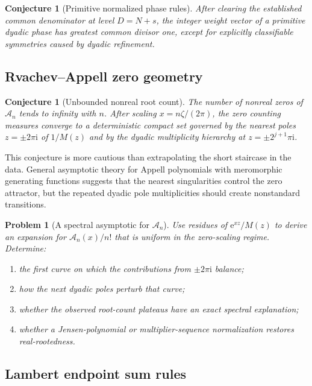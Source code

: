 \documentclass[11pt]{article}
\numberwithin{equation}{section}
\newtheorem{conjecture}[theorem]{Conjecture}
\newtheorem{problem}[theorem]{Problem}
\theoremstyle{definition}
\theoremstyle{remark}
\newcommand{\e}{\mathrm e}
\newcommand{\iu}{\mathrm i}
\newcommand{\Acal}{\mathscr A}
\begin{document}
\begin{conjecture}[Primitive normalized phase rules]
\label{conj:primitive-rules}
After clearing the established common denominator at level $D=N+s$, the integer weight vector of a primitive dyadic phase has greatest common divisor one, except for explicitly classifiable symmetries caused by dyadic refinement.
\end{conjecture}

\subsection{Rvachev--Appell zero geometry}

\begin{conjecture}[Unbounded nonreal root count]
\label{conj:Appell-root-staircase}
The number of nonreal zeros of $\Acal_n$ tends to infinity with $n$.  After scaling $x=n\zeta/(2\pi)$, the zero counting measures converge to a deterministic compact set governed by the nearest poles $z=\pm2\pi\iu$ of $1/M(z)$ and by the dyadic multiplicity hierarchy at $z=\pm2^{j+1}\pi\iu$.
\end{conjecture}

This conjecture is more cautious than extrapolating the short staircase in the data.  General asymptotic theory for Appell polynomials with meromorphic generating functions suggests that the nearest singularities control the zero attractor, but the repeated dyadic pole multiplicities should create nonstandard transitions.

\begin{problem}[A spectral asymptotic for $\Acal_n$]
\label{prob:Appell-spectral-asymptotic}
Use residues of $\e^{xz}/M(z)$ to derive an expansion for $\Acal_n(x)/n!$ that is uniform in the zero-scaling regime.  Determine:
\begin{enumerate}
\item the first curve on which the contributions from $\pm2\pi\iu$ balance;
\item how the next dyadic poles perturb that curve;
\item whether the observed root-count plateaus have an exact spectral explanation;
\item whether a Jensen-polynomial or multiplier-sequence normalization restores real-rootedness.
\end{enumerate}
\end{problem}

\subsection{Lambert endpoint sum rules}
\end{document}
